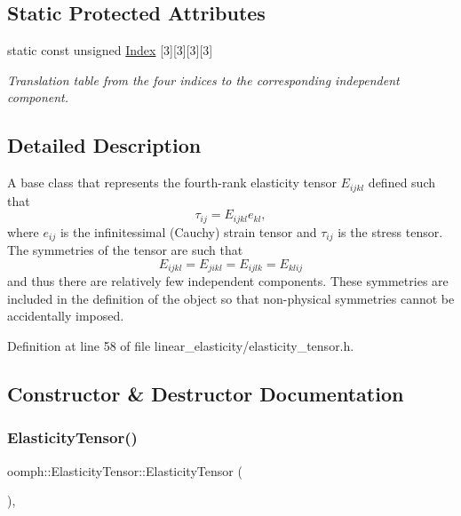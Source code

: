 \subsection*{Static Protected Attributes}
\begin{DoxyCompactItemize}
\item 
static const unsigned \hyperlink{classoomph_1_1ElasticityTensor_a6be831fdf71155ccbab14287d30587f1}{Index} \mbox{[}3\mbox{]}\mbox{[}3\mbox{]}\mbox{[}3\mbox{]}\mbox{[}3\mbox{]}
\begin{DoxyCompactList}\small\item\em Translation table from the four indices to the corresponding independent component. \end{DoxyCompactList}\end{DoxyCompactItemize}


\subsection{Detailed Description}
A base class that represents the fourth-\/rank elasticity tensor $E_{ijkl}$ defined such that \[\tau_{ij} = E_{ijkl} e_{kl},\] where $e_{ij}$ is the infinitessimal (Cauchy) strain tensor and $\tau_{ij}$ is the stress tensor. The symmetries of the tensor are such that \[E_{ijkl} = E_{jikl} = E_{ijlk} = E_{klij}\] and thus there are relatively few independent components. These symmetries are included in the definition of the object so that non-\/physical symmetries cannot be accidentally imposed. 

Definition at line 58 of file linear\+\_\+elasticity/elasticity\+\_\+tensor.\+h.



\subsection{Constructor \& Destructor Documentation}
\mbox{\label{classoomph_1_1ElasticityTensor_a94feb893f8c4180307e18aa341c046b1}} 
\subsubsection{\texorpdfstring{Elasticity\+Tensor()}{ElasticityTensor()}\hspace{0.1cm}{\footnotesize\ttfamily [1/2]}}
{\footnotesize\ttfamily oomph\+::\+Elasticity\+Tensor\+::\+Elasticity\+Tensor (\begin{DoxyParamCaption}{ }\end{DoxyParamCaption})\hspace{0.3cm}{\ttfamily [inline]}, {\ttfamily [protected]}}



